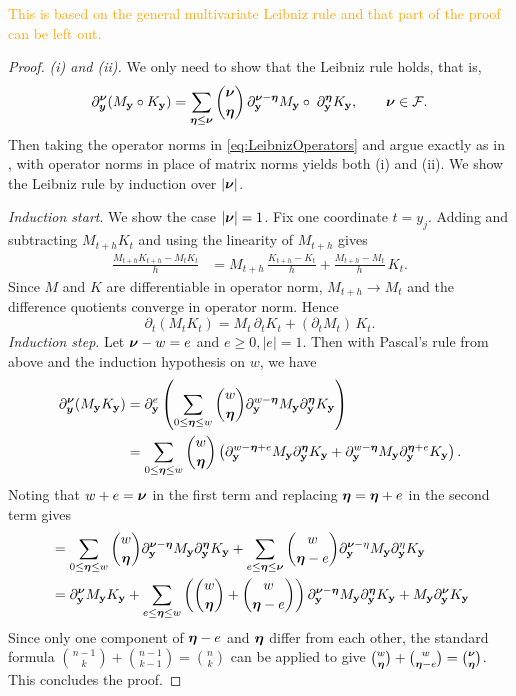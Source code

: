 \textcolor{orange}{This is based on the general multivariate Leibniz rule and that part of the proof can be left out.}
\begin{proof}
\emph{(i) and (ii).}
We only need to show that the Leibniz rule holds, that is,
\begin{equation}\label{eq:LeibnizOperators}
  \partial^{{\boldsymbol{\nu}}}_{{\boldsymbol{y}}}(M_{\mathbf{y}} \circ K_{\mathbf{y}})=\sum_{{\boldsymbol{\eta}}\le{\boldsymbol{\nu}}}\binom{{\boldsymbol{\nu}}}{{\boldsymbol{\eta}}}\,
  \partial^{{\boldsymbol{\nu}}-{\boldsymbol{\eta}}}_{\mathbf{y}} M_{\mathbf{y}} \circ \;\partial^{{\boldsymbol{\eta}}}_{\mathbf{y}} K_{\mathbf{y}} ,\qquad {\boldsymbol{\nu}}\in\mathcal{F} .
\end{equation}
Then taking the operator norms in \eqref{eq:LeibnizOperators} and argue exactly as in
\cite[Lemma~2]{chernov2026gevreyclassregularitysteadystate}, with operator norms in place of matrix norms yields both (i) and (ii).
We show the Leibniz rule by induction over $\vert {\boldsymbol{\nu}} \vert$. 

\emph{Induction start}. We show the case $\vert {\boldsymbol{\nu}} \vert = 1$. Fix one coordinate $t=y_j$. Adding and subtracting $M_{t+h}K_t$ and using the linearity of $M_{t+h}$ gives
\begin{align*}
  \frac{M_{t+h}K_{t+h}-M_tK_t}{h}
  &=M_{t+h}\,\frac{K_{t+h}-K_t}{h}+\frac{M_{t+h}-M_t}{h}\,K_t .
\end{align*}
Since $M$ and $K$ are differentiable in operator norm, $M_{t+h}\to M_t$ and the difference
quotients converge in operator norm. Hence
\begin{equation*}
  \partial_t(M_tK_t)=M_t\,\partial_tK_t+(\partial_tM_t)\,K_t .
\end{equation*}
\emph{Induction step}. Let $ {\boldsymbol{\nu}} - w =e $ and  $e \geq 0 , \vert e \vert = 1$.
Then with Pascal's rule from above and the induction hypothesis on $w$, we have  
\begin{align*}
    \partial^{{\boldsymbol{\nu}}}_{{\boldsymbol{y}}} (M_{\mathbf{y}} K_{\mathbf{y}}) &= \partial^e_{\mathbf{y}} \left( \sum_{0 \leq {\boldsymbol{\eta}} \leq w} \binom{w}{{\boldsymbol{\eta}}} \partial^{w-{\boldsymbol{\eta}}}_{\mathbf{y}} M_{\mathbf{y}}  \partial^{\boldsymbol{\eta}}_{\mathbf{y}} K_{\mathbf{y}}\right) \\
    &=  \sum_{0 \leq {\boldsymbol{\eta}} \leq w} \binom{w}{{\boldsymbol{\eta}}} \left( \partial^{w-{\boldsymbol{\eta}} +e}_{\mathbf{y}} M_{\mathbf{y}}  \partial^{\boldsymbol{\eta}}_{\mathbf{y}} K_{\mathbf{y}} + \partial^{w-{\boldsymbol{\eta}}}_{\mathbf{y}} M_{\mathbf{y}}  \partial^{{\boldsymbol{\eta}}+e}_{\mathbf{y}} K_{\mathbf{y}} \right).
\end{align*}
Noting that $w  + e = {\boldsymbol{\nu}} $ in the first term and replacing ${\boldsymbol{\eta}} = {\boldsymbol{\eta}} +e$ in the second term gives
\begin{align*}
    &= \sum_{0 \leq {\boldsymbol{\eta}} \leq w}    \binom{w}{{\boldsymbol{\eta}}} \partial^{{\boldsymbol{\nu}} -{\boldsymbol{\eta}}}_{\mathbf{y}} M_{\mathbf{y}}  \partial^{{\boldsymbol{\eta}}}_{\mathbf{y}} K_{\mathbf{y}}  + \sum_{e \leq {\boldsymbol{\eta}} \leq {\boldsymbol{\nu}} } \binom{w}{{\boldsymbol{\eta}} -e} \partial^{{\boldsymbol{\nu}} - \eta}_{\mathbf{y}} M_{\mathbf{y}}  \partial^{\eta}_{\mathbf{y}} K_{\mathbf{y}}  \\
    &= \partial^{{\boldsymbol{\nu}}}_{\mathbf{y}} M_{\mathbf{y}} K_{\mathbf{y}} + \sum_{e \leq {\boldsymbol{\eta}} \leq w} \left(\binom{w}{{\boldsymbol{\eta}}} + \binom{w}{{\boldsymbol{\eta}} - e} \right) \partial^{{\boldsymbol{\nu}} - {\boldsymbol{\eta}}}_{\mathbf{y}} M_{\mathbf{y}} \partial^{{\boldsymbol{\eta}}}_{\mathbf{y}} K_{\mathbf{y}} + M_{\mathbf{y}} \partial^{{\boldsymbol{\nu}}}_{\mathbf{y}} K_{\mathbf{y}} 
\end{align*}
Since only one component of  ${\boldsymbol{\eta}} - e $ and $ {\boldsymbol{\eta}}$ differ from each other, the standard formula $\binom{n-1}{k} + \binom{n-1}{k-1} = \binom{n}k$ can be applied to give $
\binom{w}{{\boldsymbol{\eta}}} + \binom{w}{{\boldsymbol{\eta}} - e}  = \binom{{\boldsymbol{\nu}}}{{\boldsymbol{\eta}}}$. This concludes the proof.


\end{proof}
